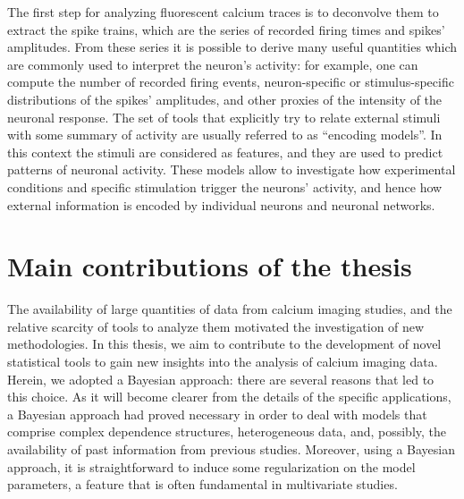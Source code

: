 The first step for analyzing fluorescent calcium traces is to deconvolve them to extract the spike trains, which are the series of recorded firing times and spikes' amplitudes.
From these series it is possible to derive many useful quantities which are commonly used to interpret the neuron's activity: for example, one can compute the number of recorded firing events, neuron-specific or stimulus-specific distributions of the spikes' amplitudes, and other proxies of the intensity of the neuronal response.
The set of tools that explicitly try to relate external stimuli with some summary of activity are usually referred to as ``encoding models''. In this context the stimuli are considered as features, and they are used to predict patterns of neuronal activity. These models allow to investigate how experimental conditions and specific stimulation trigger the neurons' activity, and hence how external information is encoded by individual neurons and neuronal networks.



\section*{Main contributions of the thesis}
The availability of large quantities of data from calcium imaging studies, and the relative scarcity of tools to analyze them motivated the investigation of new methodologies.
In this thesis, we aim to contribute to the development of novel statistical tools to gain new insights into the analysis of calcium imaging data.
Herein, we adopted a Bayesian approach: there are several reasons that led to this choice. As it will become clearer from the details of the specific applications, a Bayesian approach had proved necessary in order to deal with models that comprise complex dependence structures, heterogeneous data, and, possibly, the availability of past information from previous studies. Moreover, using a Bayesian approach, it is straightforward to induce some regularization on the model parameters, a feature that is often fundamental in multivariate studies.

